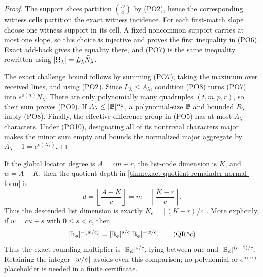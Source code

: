 \documentclass[11pt,a4paper]{amsart}
\numberwithin{equation}{section}
\theoremstyle{remark}
\begin{document}
\begin{proof}
The support slices partition \(\binom Da\) by \textup{(PO2)}, hence the
corresponding witness cells partition the exact witness incidence.  For
each first-match slope choose one witness support in its cell.  A fixed
noncommon support carries at most one slope, so this choice is injective
and proves the first inequality in \textup{(PO6)}.  Exact add-back gives
the equality there, and \textup{(PO7)} is the same inequality rewritten
using \(\lvert \Omega_\lambda\rvert=L_\lambda\bar N_\lambda\).

The exact challenge bound follows by summing \textup{(PO7)}, taking the
maximum over received lines, and using \textup{(PO2)}.  Since
\(L_\lambda\le A_\lambda\), condition \textup{(PO8)} turns
\textup{(PO7)} into
\(e^{o(n)}\bar N_\lambda\).  There are only polynomially many quadruples
\((t,m,p,r)\), so their sum proves \textup{(PO9)}.  If
\(A_\lambda\le\lvert \mathbb B\rvert^{R_\lambda}\), a polynomial-size \(\mathbb B\) and
bounded \(R_\lambda\) imply \textup{(PO8)}.  Finally, the effective
difference group in \textup{(PO5)} has at most \(A_\lambda\) characters.
Under \textup{(PO10)}, designating all of its nontrivial characters major
makes the minor sum empty and bounds the normalized major aggregate by
\(A_\lambda-1=e^{o(N_\lambda)}\).
\end{proof}

\begin{remark}
\label{rem:qr-rounding}
If the global locator degree is $A=cm+r$, the list-code dimension is $K$,
and $w=A-K$, then the quotient depth in
\cref{thm:exact-quotient-remainder-normal-form} is
\[
 d=\left\lfloor\frac{A-K}{c}\right\rfloor
   =m-\left\lceil\frac{K-r}{c}\right\rceil.         \tag{QR5b}\label{eq:qr-rounding}
\]
Thus the descended list dimension is exactly
\(K_c=\lceil(K-r)/c\rceil\).  More explicitly, if \(w=cu+s\) with
\(0\le s<c\), then
\[
 \lvert \mathbb B_\phi\rvert^{-\left\lfloor w/c\right\rfloor}
 =\lvert \mathbb B_\phi\rvert^{s/c}\lvert \mathbb B_\phi\rvert^{-w/c}.          \tag{QR5c}
\]
Thus the exact rounding multiplier is \(\lvert \mathbb B_\phi\rvert^{s/c}\), lying
between one and \(\lvert \mathbb B_\phi\rvert^{(c-1)/c}\).  Retaining the integer
\(\left\lfloor w/c\right\rfloor\) avoids even this comparison; no polynomial or
\(e^{o(n)}\) placeholder is needed in a finite certificate.
\end{remark}
\end{document}
